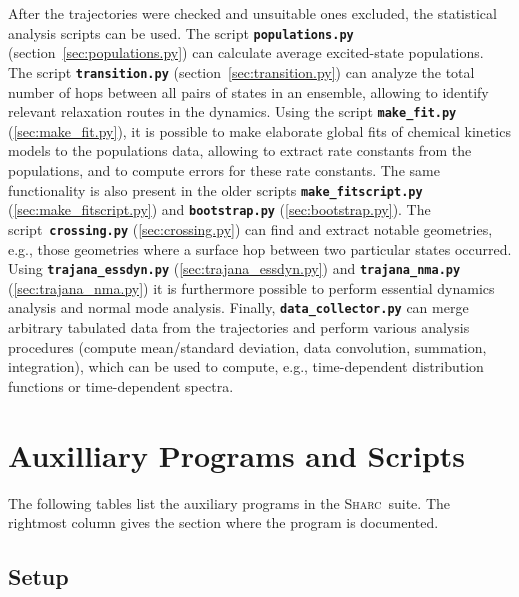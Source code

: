 \documentclass[a4paper,10pt,DIV=15,openany]{scrbook}
\newcommand{\sharc}{\textsc{Sharc}}
\newcommand{\ttt}[1]{\textbf{\texttt{#1}}}
\begin{document}
After the trajectories were checked and unsuitable ones excluded, the statistical analysis scripts can be used.
The script \ttt{populations.py} (section~\ref{sec:populations.py}) can calculate average excited-state populations. 
The script \ttt{transition.py} (section~\ref{sec:transition.py}) can analyze the total number of hops between all pairs of states in an ensemble, allowing to identify relevant relaxation routes in the dynamics.
Using the script \ttt{make\_fit.py} (\ref{sec:make_fit.py}), it is possible to make elaborate global fits of chemical kinetics models to the populations data, allowing to extract rate constants from the populations, and to compute errors for these rate constants.
The same functionality is also present in the older scripts \ttt{make\_fitscript.py} (\ref{sec:make_fitscript.py}) and \ttt{bootstrap.py} (\ref{sec:bootstrap.py}).
The script~\ttt{crossing.py} (\ref{sec:crossing.py}) can find and extract notable geometries, e.g., those geometries where a surface hop between two particular states occurred.
Using \ttt{trajana\_essdyn.py} (\ref{sec:trajana_essdyn.py}) and \ttt{trajana\_nma.py} (\ref{sec:trajana_nma.py}) it is furthermore possible to perform essential dynamics analysis and normal mode analysis.
Finally, \ttt{data\_collector.py} can merge arbitrary tabulated data from the trajectories and perform various analysis procedures (compute mean/standard deviation, data convolution, summation, integration), which can be used to compute, e.g., time-dependent distribution functions or time-dependent spectra.


\section{Auxilliary Programs and Scripts}

The following tables list the auxiliary programs in the \sharc\ suite. The rightmost column gives the section where the program is documented.

\subsection{Setup}
\end{document}
